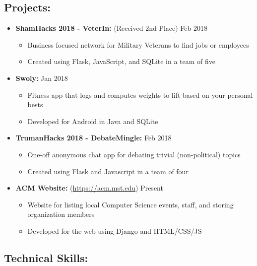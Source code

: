 \documentclass[9pt,oneside]{memoir}
\begin{document}
\subsection*{Projects:}
\begin{itemize}

	\item[] \textbf{ShamHacks 2018 - VeterIn:} (Received 2nd Place)
		\hfill Feb 2018
		\begin{itemize}
			\item[\textbullet] Business focused network for Military Veterans to find jobs or employees
			\item[\textbullet] Created using Flask, JavaScript, and SQLite in a team of five
		\end{itemize}
			
	\item[] \textbf{Swoly:}
		\hfill Jan 2018
		\begin{itemize}
			\item[\textbullet] Fitness app that logs and computes weights to lift based on your personal bests
			\item[\textbullet] Developed for Android in Java and SQLite
		\end{itemize}
		
	\item[] \textbf{TrumanHacks 2018 - DebateMingle:}
		\hfill Feb 2018
		\begin{itemize}
			\item[\textbullet] One-off anonymous chat app for debating trivial (non-political) topics
			\item[\textbullet] Created using Flask and Javascript in a team of four
		\end{itemize}

    \item[] \textbf{ACM Website:} (\url{https://acm.mst.edu})
		\hfill Present
		\begin{itemize}
			\item [\textbullet] Website for listing local Computer Science events, staff, and storing organization members
			\item[\textbullet] Developed for the web using Django and HTML/CSS/JS
		\end{itemize}
    \end{itemize}

\vspace*{-10pt}
\subsection*{Technical Skills:}
\end{document}
